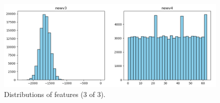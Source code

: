 \documentclass[10pt,twocolumn]{article}
\begin{document}
\begin{figure}[H]
    \centering
    \includegraphics[width=0.85\linewidth]{images/distribution_3.png}
    \caption{Distributions of features (3 of 3).}
    \label{fig:distribution-3}
\end{figure}









\printbibliography
\end{document}
